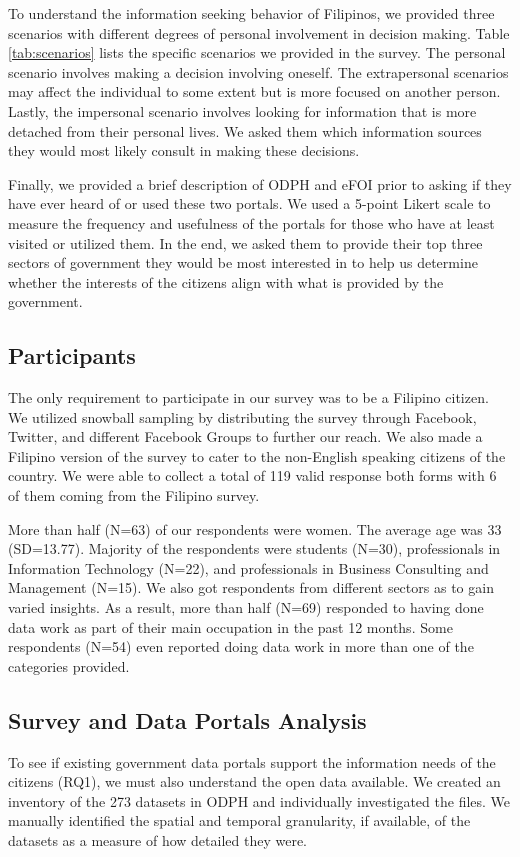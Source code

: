 \documentclass{sigchi}
\begin{document}
To understand the information seeking behavior of Filipinos, we provided three scenarios with different degrees of personal involvement in decision making. Table \ref{tab:scenarios} lists the specific scenarios we provided in the survey. The personal scenario involves making a decision involving oneself. The extrapersonal scenarios may affect the individual to some extent but is more focused on another person. Lastly, the impersonal scenario involves looking for information that is more detached from their personal lives. We asked them which information sources they would most likely consult in making these decisions.

Finally, we provided a brief description of ODPH and eFOI prior to asking if they have ever heard of or used these two portals. We used a 5-point Likert scale to measure the frequency and usefulness of the portals for those who have at least visited or utilized them. In the end, we asked them to provide their top three sectors of government they would be most interested in to help us determine whether the interests of the citizens align with what is provided by the government.

\subsection{Participants}
The only requirement to participate in our survey was to be a Filipino citizen. We utilized snowball sampling by distributing the survey through Facebook, Twitter, and different Facebook Groups to further our reach. We also made a Filipino version of the survey to cater to the non-English speaking citizens of the country. We were able to collect a total of 119 valid response both forms with 6 of them coming from the Filipino survey.

More than half (N=63) of our respondents were women. The average age was 33 (SD=13.77). Majority of the respondents were students (N=30), professionals in Information Technology (N=22), and professionals in Business Consulting and Management (N=15). We also got respondents from different sectors as to gain varied insights. As a result, more than half (N=69) responded to having done data work as part of their main occupation in the past 12 months. Some respondents (N=54) even reported doing data work in more than one of the categories provided.

\subsection{Survey and Data Portals Analysis}
To see if existing government data portals support the information needs of the citizens (RQ1), we must also understand the open data available. We created an inventory of the 273 datasets in ODPH and individually investigated the files. We manually identified the spatial and temporal granularity, if available, of the datasets as a measure of how detailed they were.
\end{document}
